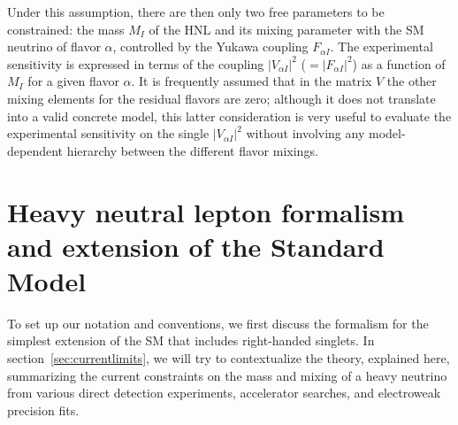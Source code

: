 Under this assumption, there are then only two free parameters to be
constrained: the mass $M_I$ of the HNL and its mixing parameter with
the SM neutrino of flavor $\alpha$, controlled by the Yukawa coupling
$F_{\alpha I}$. The experimental sensitivity is expressed in terms of
the coupling $|V_{\alpha I}|^2$ ($= |F_{\alpha I}|^2$) as a function
of $M_I$ for a given flavor $\alpha$. It is frequently assumed that in
the matrix $V$ the other mixing elements for the residual flavors are
zero; although it does not translate into a valid concrete model, this latter consideration is very useful to evaluate the experimental sensitivity on the single $|V_{\alpha I}|^2$ without involving any model-dependent hierarchy between the different flavor mixings. 

\section{Heavy neutral lepton formalism and extension of the Standard Model}
To set up our notation and conventions, we first discuss the formalism for the simplest
extension of the SM that includes right-handed singlets. In section~\ref{sec:currentlimits}, we will try to contextualize the theory, explained here, summarizing the current constraints on the mass and mixing of a heavy neutrino from various direct
detection experiments, accelerator searches, and electroweak precision
fits.

